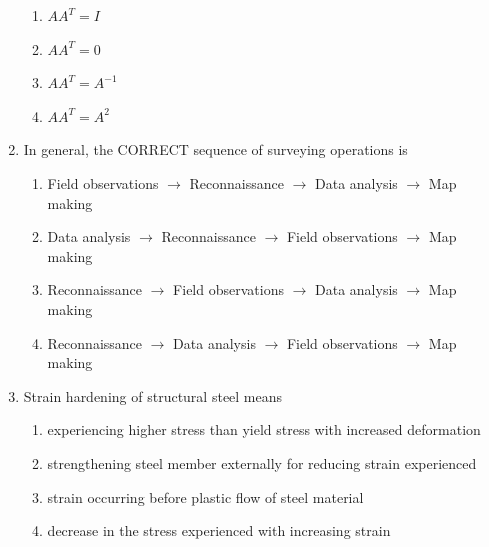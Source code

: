 \documentclass[journal,12pt,onecolumn]{article}
\theoremstyle{remark}
\begin{document}
\begin{enumerate}
\hfill{}

\begin{multicols}{2}
\begin{enumerate}
    \item $AA^T = I$
    \item $AA^T = 0$
    \item $AA^T = A^{-1}$
    \item $AA^T = A^2$
\end{enumerate}
\end{multicols}

\item In general, the CORRECT sequence of surveying operations is

\hfill{}

\begin{enumerate}
    \item Field observations $\rightarrow$ Reconnaissance $\rightarrow$ Data analysis $\rightarrow$ Map making
    \item Data analysis $\rightarrow$ Reconnaissance $\rightarrow$ Field observations $\rightarrow$ Map making
    \item Reconnaissance $\rightarrow$ Field observations $\rightarrow$ Data analysis $\rightarrow$ Map making
    \item Reconnaissance $\rightarrow$ Data analysis $\rightarrow$ Field observations $\rightarrow$ Map making
\end{enumerate}

\item Strain hardening of structural steel means

\hfill{}

\begin{enumerate}
    \item experiencing higher stress than yield stress with increased deformation
    \item strengthening steel member externally for reducing strain experienced
    \item strain occurring before plastic flow of steel material
    \item decrease in the stress experienced with increasing strain
\end{enumerate}


\end{enumerate}
\end{document}
